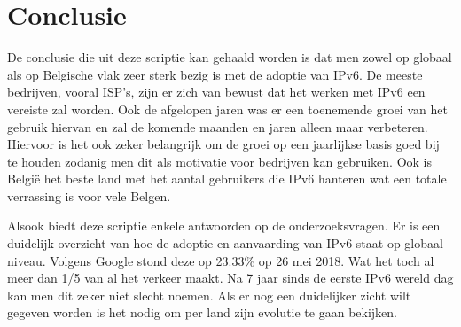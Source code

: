 
\chapter{Conclusie}
\label{ch:conclusie}



De conclusie die uit deze scriptie kan gehaald worden is dat men zowel op globaal als op Belgische vlak zeer sterk bezig is met de adoptie van IPv6. De meeste bedrijven, vooral ISP’s, zijn er zich van bewust dat het werken met IPv6 een vereiste zal worden. Ook de afgelopen jaren was er een toenemende groei van het gebruik hiervan en zal de komende maanden en jaren alleen maar verbeteren. Hiervoor is het ook zeker belangrijk om de groei op een jaarlijkse basis goed bij te houden zodanig men dit als motivatie voor bedrijven kan gebruiken. Ook is België het beste land met het aantal gebruikers die IPv6 hanteren wat een totale verrassing is voor vele Belgen.

Alsook biedt deze scriptie enkele antwoorden op de onderzoeksvragen. Er is een duidelijk overzicht van hoe de adoptie en aanvaarding van IPv6 staat op globaal niveau. Volgens Google stond deze op 23.33\% op 26 mei 2018. Wat het toch al meer dan 1/5 van al het verkeer maakt. Na 7 jaar sinds de eerste IPv6 wereld dag kan men dit zeker niet slecht noemen. Als er nog een duidelijker zicht wilt gegeven worden is het nodig om per land zijn evolutie te gaan bekijken.


